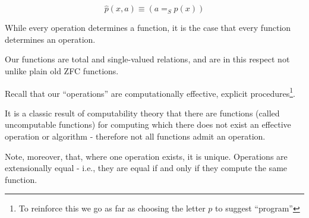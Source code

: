 \[ \hat{p}(x,a) \equiv (a =_S p(x))\]

While every operation determines a function, it is  the
case that every function determines an operation.

Our functions are total and single-valued relations, and are in this
respect not unlike plain old ZFC functions.

Recall that our ``operations'' are computationally effective, explicit
procedures\footnote{To reinforce this we go as far as choosing the
  letter $p$ to suggest ``program''}.

It is a classic result of computability theory that there are
functions (called uncomputable functions) for computing which there
does not exist an effective operation or algorithm - therefore not all
functions admit an operation.

Note, moreover, that, where one operation exists, it is unique.
Operations are extensionally equal - i.e., they are equal if and only
if they compute the same function.

